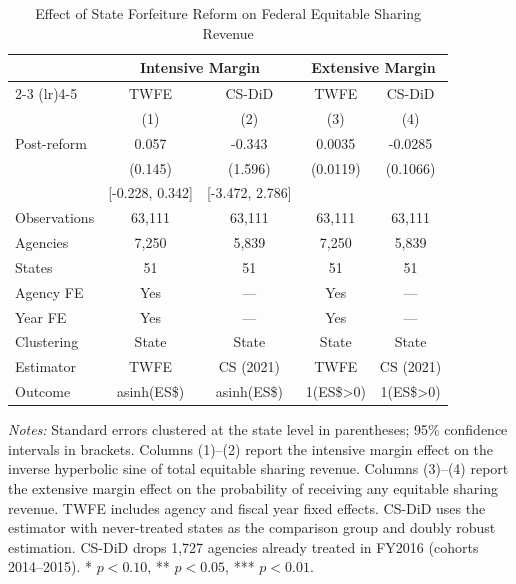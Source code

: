 \begin{table}[H]
\centering
\caption{Effect of State Forfeiture Reform on Federal Equitable Sharing Revenue}
\label{tab:main}
\begin{threeparttable}
\begin{tabular}{lcccc}
\toprule
 & \multicolumn{2}{c}{Intensive Margin} & \multicolumn{2}{c}{Extensive Margin} \\
\cmidrule(lr){2-3} \cmidrule(lr){4-5}
 & TWFE & CS-DiD & TWFE & CS-DiD \\
 & (1) & (2) & (3) & (4) \\
\midrule
Post-reform & 0.057 & -0.343 & 0.0035 & -0.0285 \\
 & (0.145) & (1.596) & (0.0119) & (0.1066) \\
 & [-0.228, 0.342] & [-3.472, 2.786] & & \\
\midrule
Observations & 63,111 & 63,111 & 63,111 & 63,111 \\
Agencies & 7,250 & 5,839 & 7,250 & 5,839 \\
States & 51 & 51 & 51 & 51 \\
Agency FE & Yes & --- & Yes & --- \\
Year FE & Yes & --- & Yes & --- \\
Clustering & State & State & State & State \\
Estimator & TWFE & CS (2021) & TWFE & CS (2021) \\
Outcome & asinh(ES\$) & asinh(ES\$) & 1(ES\$>0) & 1(ES\$>0) \\
\bottomrule
\end{tabular}
\begin{tablenotes}[flushleft]
\small
\item \textit{Notes:} Standard errors clustered at the state level in parentheses; 95\% confidence intervals in brackets. Columns (1)--(2) report the intensive margin effect on the inverse hyperbolic sine of total equitable sharing revenue. Columns (3)--(4) report the extensive margin effect on the probability of receiving any equitable sharing revenue. TWFE includes agency and fiscal year fixed effects. CS-DiD uses the \citet{callaway2021difference} estimator with never-treated states as the comparison group and doubly robust estimation. CS-DiD drops 1,727 agencies already treated in FY2016 (cohorts 2014--2015). * $p<0.10$, ** $p<0.05$, *** $p<0.01$.
\end{tablenotes}
\end{threeparttable}
\end{table}
